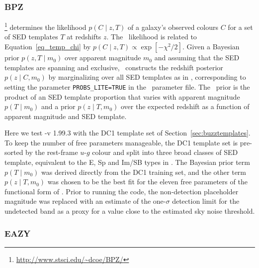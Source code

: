 \subsubsection{BPZ}
\label{sec:BPZ}

\bpz \footnote{\url{http://www.stsci.edu/~dcoe/BPZ/}} \citep[Bayesian Photometric Redshift,][]{Benitez:00} determines the likelihood $p(C \mid z, T)$ of a galaxy's observed colours $C$ for a set of SED templates $T$ at redshifts $z$.
The \bpz\ likelihood is related to Equation~\ref{eq_temp_chi} by $p(C \mid z, T) \propto \exp[- \chi^{2} / 2]$.
Given a Bayesian prior $p(z, T \mid m_{0})$ over apparent magnitude $m_0$ and assuming that the SED templates are spanning and exclusive, \bpz\ constructs the redshift posterior $p(z \mid C, m_0)$ by marginalizing over all SED templates as in \citep[Eq.~3 from][]{Benitez:00}, corresponding to setting the parameter \texttt{PROBS\_LITE=TRUE} in the \bpz\ parameter file.
The \bpz\ prior is the product of an SED template proportion that varies with apparent magnitude $p(T \mid m_{0})$ and a prior $p(z \mid T, m_{0})$ over the expected redshift as a function of apparent magnitude and SED template.

Here we test \bpz-v 1.99.3 with the DC1 template set of Section~\ref{sec:buzztemplates}.
To keep the number of free parameters manageable, the DC1 template set is pre-sorted by the rest-frame $u$-$g$ colour and split into three broad classes of SED template, equivalent to the E, Sp and Im/SB types in .
The Bayesian prior term $p(T \mid m_{0})$ was derived directly from the DC1 training set, and the other term $p(z \mid T, m_{0})$ was chosen to be the best fit for the eleven free parameters of the functional form of \citet{Benitez:00}.
Prior to running the code, the non-detection placeholder magnitude was replaced with an estimate of the one-$\sigma$ detection limit for the undetected band as a proxy for a value close to the estimated sky noise threshold.

\subsubsection{EAZY}
\label{sec:eazy}

